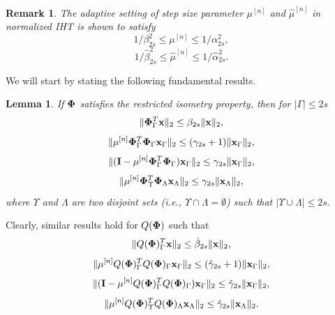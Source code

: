 \documentclass{article}
\newtheorem{lemma}{Lemma}
\newtheorem{remark}{Remark}
\begin{document}
\begin{remark}
The adaptive setting of step size parameter $\mu^{[n]}$ and $\hat{\mu}^{[n]}$ in normalized IHT is shown to satisfy
\begin{equation}\label{bounds_mu}
   1/\beta^2_{2s} \leq \mu^{[n]} \leq 1/\alpha^2_{2s},
\end{equation}
\begin{equation}\label{bounds_muhat}
   1/\hat{\beta}^2_{2s} \leq \hat{\mu}^{[n]} \leq 1/\hat{\alpha}^2_{2s}.
\end{equation}
\end{remark}


We will start by stating the following fundamental results.
\begin{lemma}\label{lemmas_on_phi}
{\rm{\cite{blumensath2010niht}}}
If ${\bf {\bf \Phi}}$ satisfies the restricted isometry property, then for $|\Gamma|\leq 2s$
\begin{equation}\label{mu*phi}
    \| {\bf {\bf \Phi}}_{\Gamma}^T{\bf x}\|_2 \leq \beta_{2s}\|{\bf x} \|_2,
\end{equation}
\begin{equation}\label{mu*phi*phi}
    \| \mu^{[n]}{\bf {\bf \Phi}}_{\Gamma}^T{\bf {\bf \Phi}}_{\Gamma}{\bf x}_{\Gamma}\|_2 \leq (\gamma_{2s}+1)\|{\bf x}_{\Gamma} \|_2,
\end{equation}
\begin{equation}\label{1-mu*phi*phi}
    \| ( {\bf I}- \mu^{[n]}{\bf {\bf \Phi}}_{\Gamma}^T{\bf {\bf \Phi}}_{\Gamma}){\bf x}_{\Gamma}\|_2 \leq \gamma_{2s}\|{\bf x}_{\Gamma} \|_2,
\end{equation}
\begin{equation}\label{mu*phi1*phi2}
     \| \mu^{[n]}{\bf {\bf \Phi}}_{\Upsilon}^T{\bf {\bf \Phi}}_{\Lambda}{\bf x}_{\Lambda}\|_2 \leq \gamma_{2s}\|{\bf x}_{\Lambda} \|_2,
\end{equation}
where $\Upsilon$ and $\Lambda$ are two disjoint sets (i.e., $\Upsilon \cap \Lambda = \emptyset$) such that $|\Upsilon \cup \Lambda| \leq 2s$. 
\end{lemma}
Clearly, similar results hold for $Q(\boldsymbol{{\bf \Phi}})$ such that
\begin{equation}\label{q_mu*phi}
     \|Q({\bf {\bf \Phi}})_{\Gamma}^T{\bf x}\|_2 \leq \hat{\beta}_{2s}\|{\bf x} \|_2,
\end{equation}
\begin{equation}\label{q_mu*phi*phi}
    \| \mu^{[n]}Q({\bf {\bf \Phi}})_{\Gamma}^TQ({\bf {\bf \Phi}})_{\Gamma}{\bf x}_{\Gamma}\|_2 \leq (\hat{\gamma}_{2s}+1)\|{\bf x}_{\Gamma} \|_2,
\end{equation}
\begin{equation}\label{1-q_mu*phi*phi}
    \| ( {\bf I}- \mu^{[n]}Q({\bf {\bf \Phi}})_{\Gamma}^TQ({\bf {\bf \Phi}})_{\Gamma}){\bf x}_{\Gamma}\|_2 \leq \hat{\gamma}_{2s}\|{\bf x}_{\Gamma} \|_2,
\end{equation}
\begin{equation}\label{q_mu*phi1*phi2}
    \| \mu^{[n]}Q({\bf {\bf \Phi}})_{\Upsilon}^TQ({\bf {\bf \Phi}})_{\Lambda}{\bf x}_{\Lambda}\|_2 \leq \hat{\gamma}_{2s}\|{\bf x}_{\Lambda} \|_2.
\end{equation}
\end{document}
